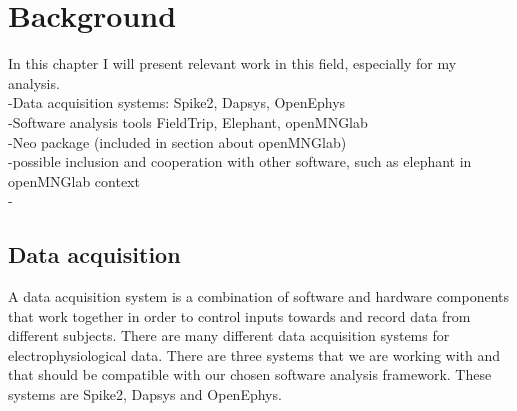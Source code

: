 \chapter{Background}
In this chapter I will present relevant work in this field, especially for my analysis.\\
-Data acquisition systems: Spike2, Dapsys, OpenEphys\\
-Software analysis tools FieldTrip, Elephant, openMNGlab\\
-Neo package (included in section about openMNGlab)\\
-possible inclusion and cooperation with other software, such as elephant in openMNGlab context\\


-%



\section{Data acquisition} 
A data acquisition system is a combination of software and hardware components that work together in order to control inputs towards and record data from different subjects.
There are many different data acquisition systems for electrophysiological data. There are three systems that we are working with and that should be compatible with our chosen software analysis framework. These systems are Spike2, Dapsys and OpenEphys.

